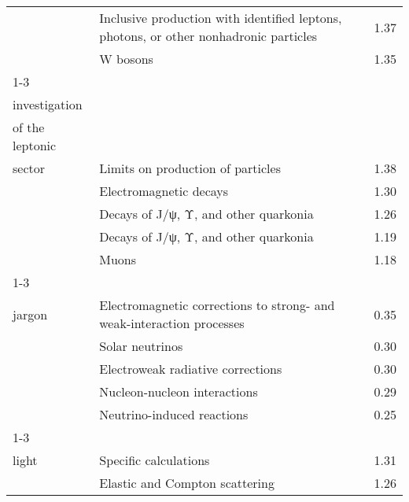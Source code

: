 \begin{longtable}[H]{p{}|p{}|p{}}
                                                               & Inclusive production with identified leptons, photons, or other nonhadronic particles &  1.37 \\
                                                               & W bosons &  1.35 \\
\cline{1-3}
\multirow{5}{*}{\begin{tabular}{l}Experimental\\ investigation\\ of the leptonic\\ sector\end{tabular}} & Limits on production of particles &  1.38 \\
                                                               & Electromagnetic decays &  1.30 \\
                                                               & Decays of J/ψ, Υ, and other quarkonia &  1.26 \\
                                                               & Decays of J/ψ, Υ, and other quarkonia &  1.19 \\
                                                               & Muons &  1.18 \\
\cline{1-3}
\multirow{5}{*}{\begin{tabular}{l}Experimental\\ jargon\end{tabular}} & Electromagnetic corrections to strong- and weak-interaction processes &  0.35 \\
                                                               & Solar neutrinos &  0.30 \\
                                                               & Electroweak radiative corrections &  0.30 \\
                                                               & Nucleon-nucleon interactions &  0.29 \\
                                                               & Neutrino-induced reactions &  0.25 \\
\cline{1-3}
\multirow{5}{*}{\begin{tabular}{l}Experiments on\\ light\end{tabular}} & Specific calculations &  1.31 \\
                                                               & Elastic and Compton scattering &  1.26 \\

\end{longtable}
